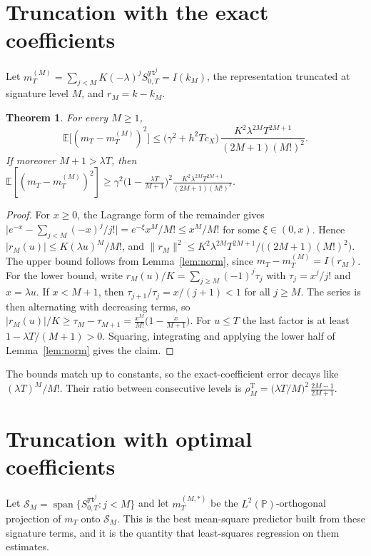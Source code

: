 \documentclass[11pt]{article}
\newtheorem{theorem}{Theorem}
\theoremstyle{remark}
\newcommand{\E}{\mathbb{E}}
\newcommand{\Sig}{S}
\newcommand{\wy}{\mathtt y}
\newcommand{\wt}{\mathtt t}
\begin{document}
\section{Truncation with the exact coefficients}

Let $m^{(M)}_T=\sum_{j<M}K(-\lambda)^j\Sig^{\wy\wt^{j}}_{0,T}=I(k_M)$, the representation truncated at
signature level $M$, and $r_M=k-k_M$.

\begin{theorem}\label{thm:taylor}
For every $M\ge1$,
\[
  \E\big[(m_T-m^{(M)}_T)^2\big]\le\big(\gamma^2+h^2Tc_X\big)\,
  \frac{K^2\lambda^{2M}T^{2M+1}}{(2M+1)(M!)^2}.
\]
If moreover $M+1>\lambda T$, then
$\E[(m_T-m^{(M)}_T)^2]\ge\gamma^2\big(1-\tfrac{\lambda T}{M+1}\big)^2\frac{K^2\lambda^{2M}T^{2M+1}}{(2M+1)(M!)^2}$.
\end{theorem}

\begin{proof}
For $x\ge0$, the Lagrange form of the remainder gives
$\big|e^{-x}-\sum_{j<M}(-x)^j/j!\big|=e^{-\xi}x^M/M!\le x^M/M!$ for some $\xi\in(0,x)$. Hence
$|r_M(u)|\le K(\lambda u)^M/M!$, and $\|r_M\|^2\le K^2\lambda^{2M}T^{2M+1}/\big((2M+1)(M!)^2\big)$.
The upper bound follows from Lemma~\ref{lem:norm}, since $m_T-m_T^{(M)}=I(r_M)$.
For the lower bound, write $r_M(u)/K=\sum_{j\ge M}(-1)^j\tau_j$ with $\tau_j=x^j/j!$ and $x=\lambda u$.
If $x<M+1$, then $\tau_{j+1}/\tau_j=x/(j+1)<1$ for all $j\ge M$. The series is then alternating with
decreasing terms, so $|r_M(u)|/K\ge\tau_M-\tau_{M+1}=\frac{x^M}{M!}\big(1-\frac{x}{M+1}\big)$.
For $u\le T$ the last factor is at least $1-\lambda T/(M+1)>0$. Squaring, integrating and applying
the lower half of Lemma~\ref{lem:norm} gives the claim.
\end{proof}

The bounds match up to constants, so the exact-coefficient error decays like $(\lambda T)^M/M!$.
Their ratio between consecutive levels is $\rho^{\mathrm{T}}_M=\big(\lambda T/M\big)^2\,\frac{2M-1}{2M+1}$.

\section{Truncation with optimal coefficients}

Let $\mathcal S_M=\operatorname{span}\{\Sig^{\wy\wt^{j}}_{0,T}:j<M\}$ and let $m^{(M,*)}_T$ be the
$L^2(\mathbb P)$-orthogonal projection of $m_T$ onto $\mathcal S_M$. This is the best mean-square
predictor built from these signature terms, and it is the quantity that least-squares
regression on them estimates.
\end{document}
